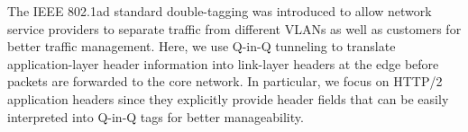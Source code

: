The IEEE 802.1ad standard \cite{IEEE802.1ad:standard} double-tagging was introduced to allow network service providers to separate traffic from different  VLANs as well as customers for better traffic management. Here, we use Q-in-Q tunneling to translate application-layer header information into link-layer headers at the edge before packets are forwarded to the core network. In particular, we focus on HTTP/2 application headers since they explicitly provide header fields that can be easily interpreted into Q-in-Q tags for better manageability.
